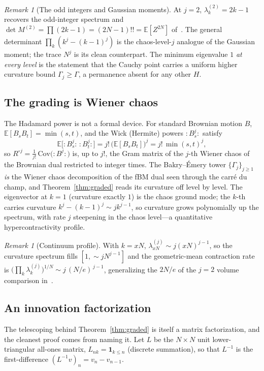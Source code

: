 \documentclass[11pt,reqno]{amsart}
\theoremstyle{plain}
\theoremstyle{definition}
\theoremstyle{remark}
\newtheorem{remark}[theorem]{Remark}
\newcommand{\E}{\mathbb E}
\newcommand{\Had}{\circ}
\begin{document}
\begin{remark}[The odd integers and Gaussian moments]
At $j=2$, $\lambda^{(2)}_k=2k-1$ recovers the odd-integer spectrum and
$\det M^{(2)}=\prod(2k-1)=(2N-1)!!=\E[Z^{2N}]$ of~\cite{FontesBE}. The
general determinant $\prod_k(k^j-(k-1)^j)$ is the chaos-level-$j$
analogue of the Gaussian moment; the trace $N^j$ is its clean
counterpart. The minimum eigenvalue $1$ \emph{at every level} is the
statement that the Cauchy point carries a uniform higher curvature
bound $\Gamma_j\ge\Gamma$, a permanence absent for any other $H$.
\end{remark}

\subsection{The grading is Wiener chaos}
The Hadamard power is not a formal device. For standard Brownian motion
$B$, $\E[B_sB_t]=\min(s,t)$, and the Wick (Hermite) powers
$:\!B_s^j\!:$ satisfy
\begin{equation}\label{eq:chaos}
   \E\bigl[:\!B_s^j\!:\,:\!B_t^j\!:\bigr]=j!\,\bigl(\E[B_sB_t]\bigr)^{j}
   =j!\,\min(s,t)^{j},
\end{equation}
so $R^{\Had j}=\tfrac1{j!}\,\mathrm{Cov}\bigl(:\!B^j\!:\bigr)$ is, up to
$j!$, the Gram matrix of the $j$-th Wiener chaos of the Brownian dual
restricted to integer times. The Bakry--\'Emery tower
$\{\Gamma_j\}_{j\ge1}$ \emph{is} the Wiener chaos decomposition of the
fBM dual seen through the carr\'e du champ, and
Theorem~\ref{thm:graded} reads its curvature off level by level. The
eigenvector at $k=1$ (curvature exactly $1$) is the chaos ground mode;
the $k$-th carries curvature $k^j-(k-1)^j\sim jk^{j-1}$, so curvature
grows polynomially up the spectrum, with rate $j$ steepening in the
chaos level---a quantitative hypercontractivity profile.

\begin{remark}[Continuum profile]\label{rem:continuum}
With $k=xN$, $\lambda^{(j)}_{xN}\sim j(xN)^{j-1}$, so the curvature
spectrum fills $[1,\sim jN^{j-1}]$ and the geometric-mean contraction
rate is $\bigl(\prod_k\lambda^{(j)}_k\bigr)^{1/N}\sim j\,(N/e)^{\,j-1}$,
generalizing the $2N/e$ of the $j=2$ volume comparison
in~\cite{FontesBE}.
\end{remark}

\subsection{An innovation factorization}\label{sec:innov}
The telescoping behind Theorem~\ref{thm:graded} is itself a matrix
factorization, and the cleanest proof comes from naming it. Let $L$ be
the $N\times N$ unit lower-triangular all-ones matrix, $L_{nk}=\mathbf
1_{k\le n}$ (discrete summation), so that $L^{-1}$ is the first-difference
$(L^{-1}v)_n=v_n-v_{n-1}$.
\end{document}
